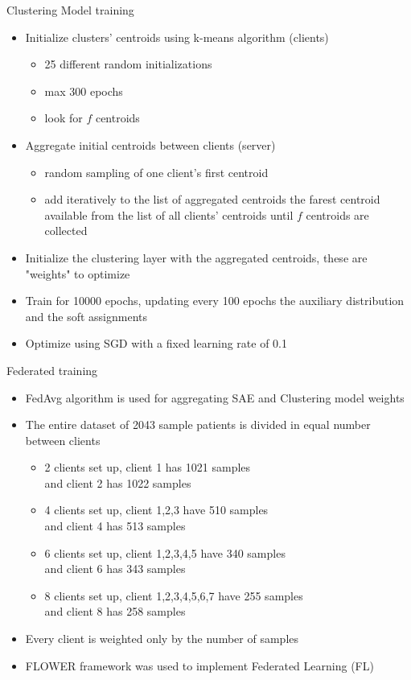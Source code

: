 \documentclass{beamer}
\begin{document}
\begin{frame}{Clustering Model training}
	\begin{itemize}
		\item Initialize clusters' centroids using k-means algorithm (clients)
		\begin{itemize}
			\item 25 different random initializations
			\item max 300 epochs
			\item look for $f$ centroids
		\end{itemize}
		\item Aggregate initial centroids between clients (server)
		\begin{itemize}
			\item random sampling of one client's first centroid
			\item add iteratively to the list of aggregated centroids the farest
				centroid available from the list of all clients' centroids until
				$f$ centroids are collected
		\end{itemize}
		\item Initialize the clustering layer with the aggregated centroids, 
			these are "weights" to optimize
		\item Train for 10000 epochs, updating every 100 epochs the auxiliary distribution
			and the soft assignments
		\item Optimize using SGD with a fixed learning rate of 0.1
	\end{itemize}
\end{frame}

\begin{frame}{Federated training}
	\begin{itemize}
		\item FedAvg algorithm\cite{mcmahan2017communicationefficient} is used for aggregating SAE and Clustering model weights
		\item The entire dataset of 2043 sample patients is divided in equal number between clients
		\begin{itemize}
			\item 2 clients set up, client 1 has 1021 samples\\and client 2 has 1022 samples
			\item 4 clients set up, client 1,2,3 have 510 samples\\and client 4 has 513 samples
			\item 6 clients set up, client 1,2,3,4,5 have 340 samples\\and client 6 has 343 samples
			\item 8 clients set up, client 1,2,3,4,5,6,7 have 255 samples\\and client 8 has 258 samples
		\end{itemize}
		\item Every client is weighted only by the number of samples
		\item FLOWER framework\cite{beutel2021flower} was used to implement Federated Learning (FL)
	\end{itemize}
\end{frame}
\end{document}

